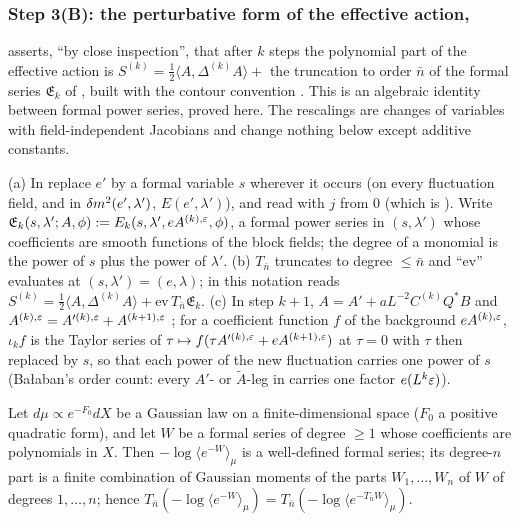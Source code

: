 \subsubsection*{Step 3(B): the perturbative form of the effective action, \cite[(3.34)--(3.36)]{Ba1}}

\cite[(3.36)]{Ba1} asserts, ``by close inspection'', that after $k$ steps the polynomial part of the effective action is $S^{(k)}=\frac12\langle A,\Delta^{(k)}A\rangle+$ the truncation to order $\bar n$ of the formal series $\mathfrak E_k$ of \cite[(3.35)]{Ba1}, built with the contour convention \cite[(3.34)]{Ba1}. This is an algebraic identity between formal power series, proved here. The rescalings \cite[(1.22)]{Ba1} are changes of variables with field-independent Jacobians and change nothing below except additive constants.

\begin{definition}\label{def:a06d:B1}
\textup{(a)} In \cite[(3.35)]{Ba1} replace $e'$ by a formal variable $s$ wherever it occurs (on every fluctuation field, and in $\delta m^2(e',\lambda')$, $E(e',\lambda')$), and read \cite[(3.34)]{Ba1} with $j$ from $0$ (which is \cite[(1.3)]{Ba3}). Write $\mathfrak E_k(s,\lambda';A,\phi):= E_k(s,\lambda',eA^{(k),\varepsilon},\phi)$, a formal power series in $(s,\lambda')$ whose coefficients are smooth functions of the block fields; the degree of a monomial is the power of $s$ plus the power of $\lambda'$. \textup{(b)} $T_{\bar n}$ truncates to degree $\le\bar n$ and ``$\mathrm{ev}$'' evaluates at $(s,\lambda')=(e,\lambda)$; in this notation \cite[(3.36)]{Ba1} reads $S^{(k)}=\frac12\langle A,\Delta^{(k)}A\rangle+\mathrm{ev}\,T_{\bar n}\mathfrak E_k$. \textup{(c)} In step $k+1$, $A=A'+aL^{-2}C^{(k)}Q^*B$ \cite[(3.41)]{Ba1} and $A^{(k),\varepsilon}=A'^{(k),\varepsilon}+A^{(k+1),\varepsilon}$ \cite[(3.42)]{Ba1}; for a coefficient function $f$ of the background $eA^{(k),\varepsilon}$, $\iota_kf$ is the Taylor series of $\tau\mapsto f(\tau A'^{(k),\varepsilon}+eA^{(k+1),\varepsilon})$ at $\tau=0$ with $\tau$ then replaced by $s$, so that each power of the new fluctuation carries one power of $s$ (Ba{\l}aban's order count: every $A'$- or $\tilde A$-leg in \cite[(1.8)--(1.15)]{Ba3} carries one factor $e(L^k\varepsilon)$).
\end{definition}

\begin{lemma}\label{lem:a06d:B2}
Let $d\mu\propto e^{-F_0}dX$ be a Gaussian law on a finite-dimensional space ($F_0$ a positive quadratic form), and let $W$ be a formal series of degree $\ge1$ whose coefficients are polynomials in $X$. Then $-\log\langle e^{-W}\rangle_\mu$ is a well-defined formal series; its degree-$n$ part is a finite combination of Gaussian moments of the parts $W_1,\dots,W_n$ of $W$ of degrees $1,\dots,n$; hence $T_{\bar n}(-\log\langle e^{-W}\rangle_\mu)=T_{\bar n}(-\log\langle e^{-T_{\bar n}W}\rangle_\mu)$.
\end{lemma}

